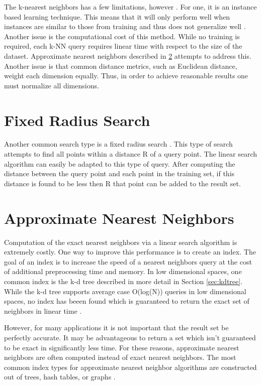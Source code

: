 The k-nearest neighbors has a few limitations, however \citep{beyer1999nearest}.  For one, it is an instance based learning technique.  This means that it will only perform well when instances are similar to those from training and thus does not generalize well \citep{aha1991instance}.  Another issue is the computational cost of this method.  While no training is required, each k-NN query requires linear time with respect to the size of the dataset.  Approximate nearest neighbors described in \ref{sec:ann} attempts to address this.  Another issue is that common distance metrics, such as Euclidean distance, weight each dimension equally.  Thus, in order to achieve reasonable results one must normalize all dimensions.

\section{Fixed Radius Search}

Another common search type is a fixed radius search \citep{dickerson1990fixed}.  This type of search attempts to find all points within a distance R of a query point.  The linear search algorithm can easily be adapted to this type of query.  After computing the distance between the query point and each point in the training set, if this distance is found to be less then R that point can be added to the result set.

\section{Approximate Nearest Neighbors}
\label{sec:ann}

Computation of the exact nearest neighbors via a linear search algorithm is extremely costly.  One way to improve this performance is to create an index.  The goal of an index is to increase the speed of a nearest neighbors query at the cost of additional preprocessing time and memory.  In low dimensional spaces, one common index is the k-d tree described in more detail in Section \ref{sec:kdtree}.  While the k-d tree supports average case O(log(N)) queries in low dimensional spaces, no index has beeen found which is guaranteed to return the exact set of neighbors in linear time \citep{muja_flann_2009}.

However, for many applications it is not important that the result set be perfectly accurate.  It may be advantageous to return a set which isn't guaranteed to be exact in significantly less time. For these reasons, approximate nearest neighbors are often computed instead of exact nearest neighbors.  The most common index types for approximate nearest neighbor algorithms are constructed out of trees, hash tables, or graphs \citep{flann_pami_2014}.

